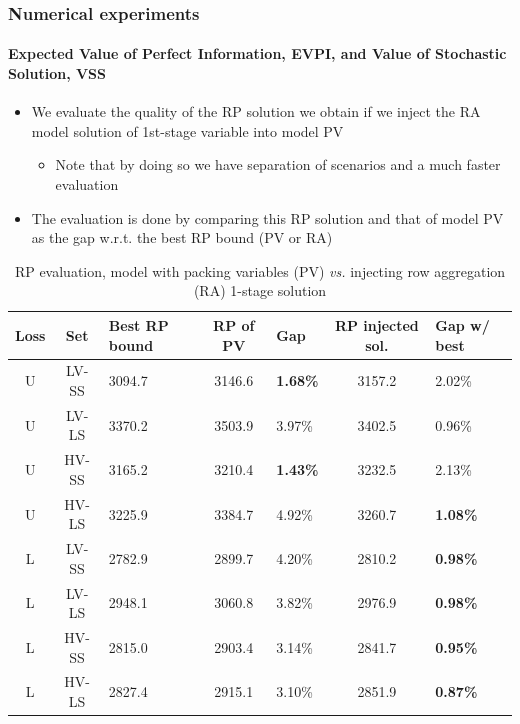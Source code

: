 \documentclass[9pt,xcolor={dvipsnames}]{beamer}
\begin{document}
\begin{frame}[allowframebreaks]
	\frametitle{Numerical experiments}
	\framesubtitle{Expected Value of Perfect Information, EVPI, and Value of Stochastic Solution, VSS}
	\begin{itemize}
		\footnotesize
		\item We evaluate the quality of the RP solution we obtain if we inject the RA model solution of 1st-stage variable into model PV
		\begin{itemize}
			\item Note that by doing so we have separation of scenarios and a much faster evaluation
		\end{itemize}
		\medskip 
		\item The evaluation is done by comparing this RP solution and that of model PV as the gap w.r.t. the best RP bound (PV or RA)
	\end{itemize}
	\begin{table}[h!]
		\centering
		\footnotesize
		\begin{tabular}{c c j c f c f}
			\hline
			Loss &
			Set & 
			Best RP bound & 
			RP of PV &
			Gap & 
			RP injected sol. & 
			Gap w/ best \\
			\hline
			U & LV-SS & 3094.7 & 3146.6 & \textbf{1.68\%} & 3157.2 & 2.02\% \\
			U & LV-LS & 3370.2 & 3503.9 & 3.97\% & 3402.5 & 0.96\% \\
			U & HV-SS & 3165.2 & 3210.4 & \textbf{1.43\%} & 3232.5 & 2.13\% \\
			U & HV-LS & 3225.9 & 3384.7 & 4.92\% & 3260.7 & \textbf{1.08\%} \\
			\hline
			L & LV-SS & 2782.9 & 2899.7 & 4.20\% & 2810.2 & \textbf{0.98\%} \\
			L & LV-LS & 2948.1 & 3060.8 & 3.82\% & 2976.9 & \textbf{0.98\%} \\
			L & HV-SS & 2815.0 & 2903.4 & 3.14\% & 2841.7 & \textbf{0.95\%} \\
			L & HV-LS & 2827.4 & 2915.1 & 3.10\% & 2851.9 & \textbf{0.87\%} \\
			\hline
		\end{tabular}
		\caption{RP evaluation, model with packing variables (PV) \textit{vs.} injecting row aggregation (RA) 1-stage solution}
		\label{tab:optres4}
	\end{table}

\end{frame}
\end{document}
